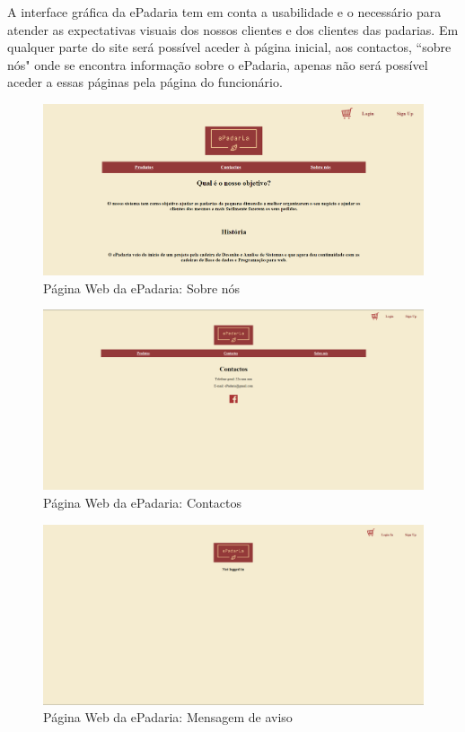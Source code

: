 A interface gráfica da ePadaria tem em conta a usabilidade e o necessário para atender as expectativas visuais dos nossos clientes e dos clientes das padarias. Em qualquer parte do site será possível aceder à página inicial, aos contactos, “sobre nós" onde se encontra informação sobre o ePadaria, apenas não será possível aceder a essas páginas pela página do funcionário.
\begin{figure}[H]
	\centering
	\includegraphics[width=15cm]{"mockup sobre nos"}
	\caption{Página Web da ePadaria: Sobre nós}
	\label{fig:mockup-sobre-nos}
\end{figure}

\begin{figure}[H]
	\centering
	\includegraphics[width=15cm]{Contactos}
	\caption{Página Web da ePadaria: Contactos}
	\label{fig:Contactos}
\end{figure}

\begin{figure}[H]
	\centering
	\includegraphics[width=15cm]{Produtos1}
	\caption{Página Web da ePadaria: Mensagem de aviso}
	\label{fig:produtos1}
\end{figure}

